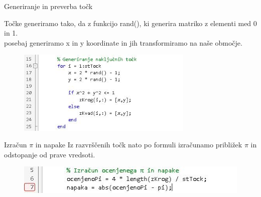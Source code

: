 \documentclass{beamer}
\begin{document}
\begin{frame}{Generiranje in preverba točk}

    Točke generiramo tako, da z funkcijo rand(), ki generira matriko z elementi med 0 in 1.\\
    posebaj generiramo x in y koordinate in jih transformiramo na naše območje.
    
    \begin{figure}
          \centering
          \includegraphics[height=4cm]{generiranje_točk.JPG}
    \end{figure}

\end{frame}

\begin{frame}{Izračun $\pi$ in napake}
    Iz razvrščenih točk nato po formuli izračunamo približek $\pi$ in odstopanje od prave vredsoti.
    
    \begin{figure}
          \centering
          \includegraphics[width=12cm]{izračun.JPG}
    \end{figure}

\end{frame}
\end{document}
